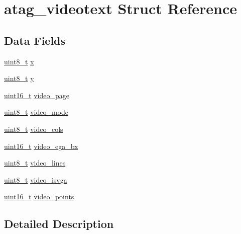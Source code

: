 \hypertarget{structatag__videotext}{\section{atag\-\_\-videotext \-Struct \-Reference}
\label{structatag__videotext}
}
\subsection*{\-Data \-Fields}
\begin{DoxyCompactItemize}
\item 
\hyperlink{arch__types_8h_aba7bc1797add20fe3efdf37ced1182c5}{uint8\-\_\-t} \hyperlink{structatag__videotext_a0f561e77fa0f040b637f4e04f6cd8078}{x}
\item 
\hyperlink{arch__types_8h_aba7bc1797add20fe3efdf37ced1182c5}{uint8\-\_\-t} \hyperlink{structatag__videotext_a17f97f62d93bc8cfb4a2b5d273a2aa72}{y}
\item 
\hyperlink{arch__types_8h_a273cf69d639a59973b6019625df33e30}{uint16\-\_\-t} \hyperlink{structatag__videotext_ac6354ba51fe0fff7ac457ff0e4bf7c68}{video\-\_\-page}
\item 
\hyperlink{arch__types_8h_aba7bc1797add20fe3efdf37ced1182c5}{uint8\-\_\-t} \hyperlink{structatag__videotext_a1180b6b69ea36c4403ecfac38a3325db}{video\-\_\-mode}
\item 
\hyperlink{arch__types_8h_aba7bc1797add20fe3efdf37ced1182c5}{uint8\-\_\-t} \hyperlink{structatag__videotext_abd7a24d04c2e3a051bd316e44d025bbd}{video\-\_\-cols}
\item 
\hyperlink{arch__types_8h_a273cf69d639a59973b6019625df33e30}{uint16\-\_\-t} \hyperlink{structatag__videotext_a4fd68ac4ef39d5a73df67c42479b7380}{video\-\_\-ega\-\_\-bx}
\item 
\hyperlink{arch__types_8h_aba7bc1797add20fe3efdf37ced1182c5}{uint8\-\_\-t} \hyperlink{structatag__videotext_a63e3f823f9549fdb1ad1237f128afc56}{video\-\_\-lines}
\item 
\hyperlink{arch__types_8h_aba7bc1797add20fe3efdf37ced1182c5}{uint8\-\_\-t} \hyperlink{structatag__videotext_a8705641c3e6bd566573a2afe3bb66569}{video\-\_\-isvga}
\item 
\hyperlink{arch__types_8h_a273cf69d639a59973b6019625df33e30}{uint16\-\_\-t} \hyperlink{structatag__videotext_afe98e092bcb87124948444d17b59727b}{video\-\_\-points}
\end{DoxyCompactItemize}


\subsection{\-Detailed \-Description}


